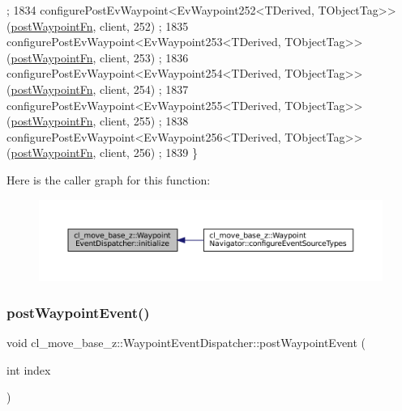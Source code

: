\begin{DoxyCode}
      ;
1834     configurePostEvWaypoint<EvWaypoint252<TDerived, TObjectTag>>(\hyperlink{classcl__move__base__z_1_1WaypointEventDispatcher_a964a57fcce5d48ec60243230722d8dd7}{postWaypointFn}, client, 252)
      ;
1835     configurePostEvWaypoint<EvWaypoint253<TDerived, TObjectTag>>(\hyperlink{classcl__move__base__z_1_1WaypointEventDispatcher_a964a57fcce5d48ec60243230722d8dd7}{postWaypointFn}, client, 253)
      ;
1836     configurePostEvWaypoint<EvWaypoint254<TDerived, TObjectTag>>(\hyperlink{classcl__move__base__z_1_1WaypointEventDispatcher_a964a57fcce5d48ec60243230722d8dd7}{postWaypointFn}, client, 254)
      ;
1837     configurePostEvWaypoint<EvWaypoint255<TDerived, TObjectTag>>(\hyperlink{classcl__move__base__z_1_1WaypointEventDispatcher_a964a57fcce5d48ec60243230722d8dd7}{postWaypointFn}, client, 255)
      ;
1838     configurePostEvWaypoint<EvWaypoint256<TDerived, TObjectTag>>(\hyperlink{classcl__move__base__z_1_1WaypointEventDispatcher_a964a57fcce5d48ec60243230722d8dd7}{postWaypointFn}, client, 256)
      ;
1839 \}
\end{DoxyCode}
Here is the caller graph for this function\+:
\nopagebreak
\begin{figure}[H]
\begin{center}
\leavevmode
\includegraphics[width=350pt]{classcl__move__base__z_1_1WaypointEventDispatcher_a89674461d32af85dd64ca49290dbd010_icgraph}
\end{center}
\end{figure}
\mbox{\label{classcl__move__base__z_1_1WaypointEventDispatcher_a6462eae610b97df2207ecd93c1544aaf}} 
\subsubsection{\texorpdfstring{post\+Waypoint\+Event()}{postWaypointEvent()}}
{\footnotesize\ttfamily void cl\+\_\+move\+\_\+base\+\_\+z\+::\+Waypoint\+Event\+Dispatcher\+::post\+Waypoint\+Event (\begin{DoxyParamCaption}\item[{int}]{index }\end{DoxyParamCaption})}



